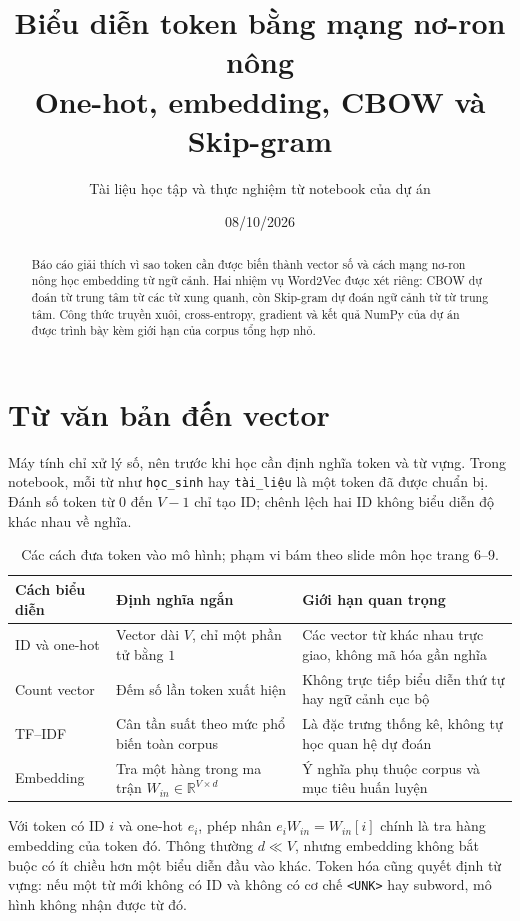 \documentclass[12pt,a4paper]{article}
\title{\textbf{Biểu diễn token bằng mạng nơ-ron nông}\\\large One-hot, embedding, CBOW và Skip-gram}
\author{Tài liệu học tập và thực nghiệm từ notebook của dự án}
\date{08/10/2026}
\begin{document}
\maketitle
\begin{abstract}
Báo cáo giải thích vì sao token cần được biến thành vector số và cách mạng nơ-ron nông học embedding từ ngữ cảnh. Hai nhiệm vụ Word2Vec được xét riêng: CBOW dự đoán từ trung tâm từ các từ xung quanh, còn Skip-gram dự đoán ngữ cảnh từ từ trung tâm. Công thức truyền xuôi, cross-entropy, gradient và kết quả NumPy của dự án được trình bày kèm giới hạn của corpus tổng hợp nhỏ.
\end{abstract}
\tableofcontents

\section{Từ văn bản đến vector}
Máy tính chỉ xử lý số, nên trước khi học cần định nghĩa token và từ vựng. Trong notebook, mỗi từ như \texttt{học\_sinh} hay \texttt{tài\_liệu} là một token đã được chuẩn bị. Đánh số token từ $0$ đến $V-1$ chỉ tạo ID; chênh lệch hai ID không biểu diễn độ khác nhau về nghĩa.

\begin{table}[ht]
\centering\small
\begin{tabular}{p{3.3cm}p{4.4cm}p{5.6cm}}\toprule
Cách biểu diễn & Định nghĩa ngắn & Giới hạn quan trọng\\\midrule
ID và one-hot & Vector dài $V$, chỉ một phần tử bằng $1$ & Các vector từ khác nhau trực giao, không mã hóa gần nghĩa\\
Count vector & Đếm số lần token xuất hiện & Không trực tiếp biểu diễn thứ tự hay ngữ cảnh cục bộ\\
TF--IDF & Cân tần suất theo mức phổ biến toàn corpus & Là đặc trưng thống kê, không tự học quan hệ dự đoán\\
Embedding & Tra một hàng trong ma trận $W_{in}\in\mathbb R^{V\times d}$ & Ý nghĩa phụ thuộc corpus và mục tiêu huấn luyện\\\bottomrule
\end{tabular}
\caption{Các cách đưa token vào mô hình; phạm vi bám theo slide môn học trang 6--9.}
\end{table}
Với token có ID $i$ và one-hot $e_i$, phép nhân $e_iW_{in}=W_{in}[i]$ chính là tra hàng embedding của token đó. Thông thường $d\ll V$, nhưng embedding không bắt buộc có ít chiều hơn một biểu diễn đầu vào khác. Token hóa cũng quyết định từ vựng: nếu một từ mới không có ID và không có cơ chế \texttt{<UNK>} hay subword, mô hình không nhận được từ đó.
\end{document}
